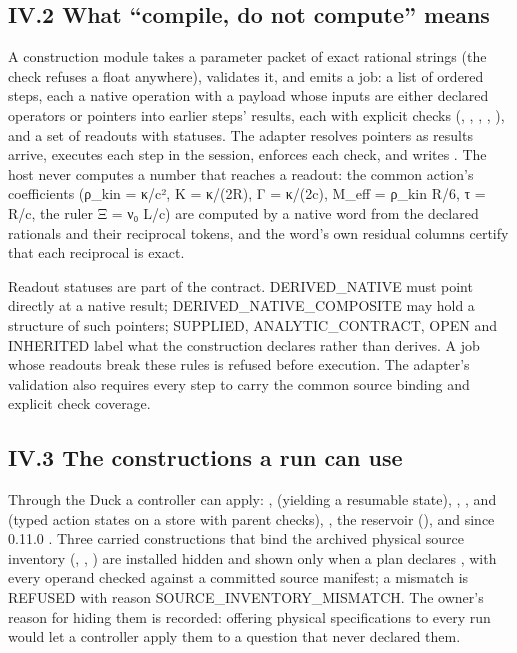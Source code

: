 \subsection{IV.2 What ``compile, do not compute'' means}\label{iv.2-what-compile-do-not-compute-means}

A construction module takes a parameter packet of exact rational strings (the  check refuses a float anywhere), validates it,
and emits a job: a list of ordered steps, each a native operation with a payload whose inputs are either declared operators or pointers
 into earlier steps' results, each with explicit checks (, , ,
, ), and a set of readouts with statuses. The adapter resolves pointers as results arrive, executes
each step in the session, enforces each check, and writes . The host never computes a number that reaches a readout: the
common action's coefficients (ρ\_kin = κ/c², K = κ/(2R), Γ = κ/(2c), M\_eff = ρ\_kin R/6, τ = R/c, the ruler Ξ = ν₀ L/c) are computed by a native
word from the declared rationals and their reciprocal tokens, and the word's own residual columns certify that each reciprocal is exact.

Readout statuses are part of the contract. DERIVED\_NATIVE must point directly at a native result; DERIVED\_NATIVE\_COMPOSITE may hold a
structure of such pointers; SUPPLIED, ANALYTIC\_CONTRACT, OPEN and INHERITED label what the construction declares rather than derives. A
job whose readouts break these rules is refused before execution. The adapter's validation also requires every step to carry the common
source binding and explicit check coverage.

\subsection{IV.3 The constructions a run can use}\label{iv.3-the-constructions-a-run-can-use}

Through the Duck a controller can apply: ,  (yielding a resumable state), , ,
 and  (typed action states on a store with parent checks), , the reservoir
(), and since 0.11.0 . Three carried constructions that bind the archived physical source inventory
(, , ) are installed hidden and shown only when a plan declares
, with every operand checked against a committed source manifest; a mismatch is REFUSED with reason
SOURCE\_INVENTORY\_MISMATCH. The owner's reason for hiding them is recorded: offering physical specifications to every run would let a
controller apply them to a question that never declared them.

